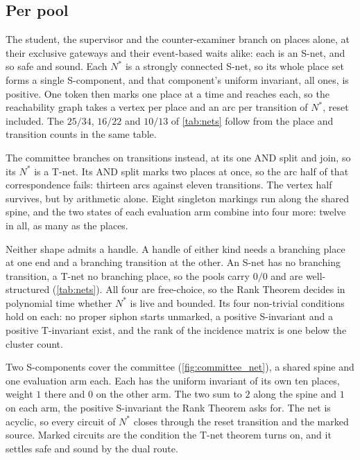 \subsection{Per pool}
\label{sec:pools}

The student, the supervisor and the counter-examiner branch on places alone, at their exclusive gateways and their event-based waits alike: each is an S-net, and so safe and sound. Each $N^*$ is a strongly connected S-net, so its whole place set forms a single S-component, and that component's uniform invariant, all ones, is positive. One token then marks one place at a time and reaches each, so the reachability graph takes a vertex per place and an arc per transition of $N^*$, reset included. The $25/34$, $16/22$ and $10/13$ of \cref{tab:nets} follow from the place and transition counts in the same table.

The committee branches on transitions instead, at its one AND split and join, so its $N^*$ is a T-net. Its AND split marks two places at once, so the arc half of that correspondence fails: thirteen arcs against eleven transitions. The vertex half survives, but by arithmetic alone. Eight singleton markings run along the shared spine, and the two states of each evaluation arm combine into four more: twelve in all, as many as the places.

Neither shape admits a handle. A handle of either kind needs a branching place at one end and a branching transition at the other. An S-net has no branching transition, a T-net no branching place, so the pools carry $0/0$ and are well-structured (\cref{tab:nets}). All four are free-choice, so the Rank Theorem decides in polynomial time whether $N^*$ is live and bounded. Its four non-trivial conditions hold on each: no proper siphon starts unmarked, a positive S-invariant and a positive T-invariant exist, and the rank of the incidence matrix is one below the cluster count.



Two S-components cover the committee (\cref{fig:committee_net}), a shared spine and one evaluation arm each. Each has the uniform invariant of its own ten places, weight $1$ there and $0$ on the other arm. The two sum to $2$ along the spine and $1$ on each arm, the positive S-invariant the Rank Theorem asks for. The net is acyclic, so every circuit of $N^*$ closes through the reset transition and the marked source. Marked circuits are the condition the T-net theorem turns on, and it settles safe and sound by the dual route.

